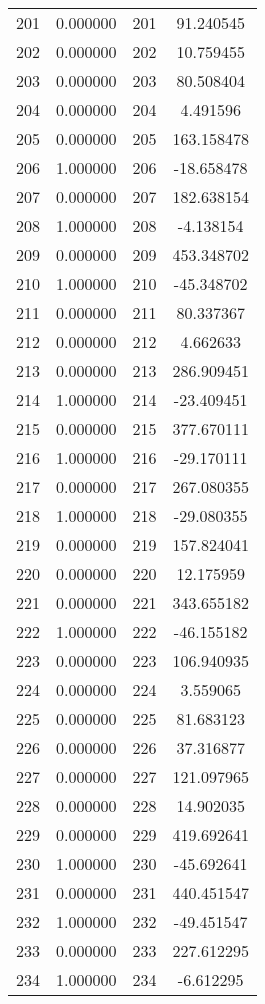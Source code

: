 \documentclass[12pt]{article}
\begin{document}
\begin{longtable}{@{}cccc@{}}
201 & 0.000000 & 201 & 91.240545 \\
202 & 0.000000 & 202 & 10.759455 \\
203 & 0.000000 & 203 & 80.508404 \\
204 & 0.000000 & 204 & 4.491596 \\
205 & 0.000000 & 205 & 163.158478 \\
206 & 1.000000 & 206 & -18.658478 \\
207 & 0.000000 & 207 & 182.638154 \\
208 & 1.000000 & 208 & -4.138154 \\
209 & 0.000000 & 209 & 453.348702 \\
210 & 1.000000 & 210 & -45.348702 \\
211 & 0.000000 & 211 & 80.337367 \\
212 & 0.000000 & 212 & 4.662633 \\
213 & 0.000000 & 213 & 286.909451 \\
214 & 1.000000 & 214 & -23.409451 \\
215 & 0.000000 & 215 & 377.670111 \\
216 & 1.000000 & 216 & -29.170111 \\
217 & 0.000000 & 217 & 267.080355 \\
218 & 1.000000 & 218 & -29.080355 \\
219 & 0.000000 & 219 & 157.824041 \\
220 & 0.000000 & 220 & 12.175959 \\
221 & 0.000000 & 221 & 343.655182 \\
222 & 1.000000 & 222 & -46.155182 \\
223 & 0.000000 & 223 & 106.940935 \\
224 & 0.000000 & 224 & 3.559065 \\
225 & 0.000000 & 225 & 81.683123 \\
226 & 0.000000 & 226 & 37.316877 \\
227 & 0.000000 & 227 & 121.097965 \\
228 & 0.000000 & 228 & 14.902035 \\
229 & 0.000000 & 229 & 419.692641 \\
230 & 1.000000 & 230 & -45.692641 \\
231 & 0.000000 & 231 & 440.451547 \\
232 & 1.000000 & 232 & -49.451547 \\
233 & 0.000000 & 233 & 227.612295 \\
234 & 1.000000 & 234 & -6.612295 \\

\end{longtable}
\end{document}
